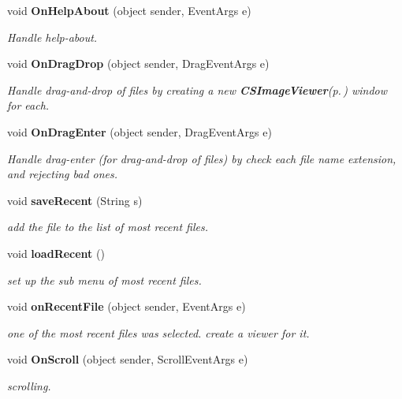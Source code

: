 \begin{CompactItemize}
void {\bf On\-Help\-About} (object sender, Event\-Args e)
\begin{CompactList}\small\item\em Handle help-about. \item\end{CompactList}\item 
void {\bf On\-Drag\-Drop} (object sender, Drag\-Event\-Args e)
\begin{CompactList}\small\item\em Handle drag-and-drop of files by creating a new {\bf CSImage\-Viewer}{\rm (p.\,\pageref{class_c_s_image_viewer_1_1_c_s_image_viewer})} window for each. \item\end{CompactList}\item 
void {\bf On\-Drag\-Enter} (object sender, Drag\-Event\-Args e)
\begin{CompactList}\small\item\em Handle drag-enter (for drag-and-drop of files) by check each file name extension, and rejecting bad ones. \item\end{CompactList}\item 
void {\bf save\-Recent} (String s)
\begin{CompactList}\small\item\em add the file to the list of most recent files. \item\end{CompactList}\item 
void {\bf load\-Recent} ()
\begin{CompactList}\small\item\em set up the sub menu of most recent files. \item\end{CompactList}\item 
void {\bf on\-Recent\-File} (object sender, Event\-Args e)
\begin{CompactList}\small\item\em one of the most recent files was selected. create a viewer for it. \item\end{CompactList}\item 
void {\bf On\-Scroll} (object sender, Scroll\-Event\-Args e)
\begin{CompactList}\small\item\em scrolling. \item\end{CompactList}\end{CompactItemize}
